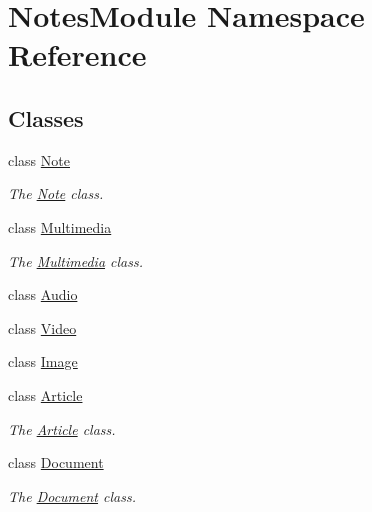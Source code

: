 \hypertarget{namespace_notes_module}{\section{Notes\-Module Namespace Reference}
\label{namespace_notes_module}
}
\subsection*{Classes}
\begin{DoxyCompactItemize}
\item 
class \hyperlink{class_notes_module_1_1_note}{Note}
\begin{DoxyCompactList}\small\item\em The \hyperlink{class_notes_module_1_1_note}{Note} class. \end{DoxyCompactList}\item 
class \hyperlink{class_notes_module_1_1_multimedia}{Multimedia}
\begin{DoxyCompactList}\small\item\em The \hyperlink{class_notes_module_1_1_multimedia}{Multimedia} class. \end{DoxyCompactList}\item 
class \hyperlink{class_notes_module_1_1_audio}{Audio}
\item 
class \hyperlink{class_notes_module_1_1_video}{Video}
\item 
class \hyperlink{class_notes_module_1_1_image}{Image}
\item 
class \hyperlink{class_notes_module_1_1_article}{Article}
\begin{DoxyCompactList}\small\item\em The \hyperlink{class_notes_module_1_1_article}{Article} class. \end{DoxyCompactList}\item 
class \hyperlink{class_notes_module_1_1_document}{Document}
\begin{DoxyCompactList}\small\item\em The \hyperlink{class_notes_module_1_1_document}{Document} class. \end{DoxyCompactList}\end{DoxyCompactItemize}
